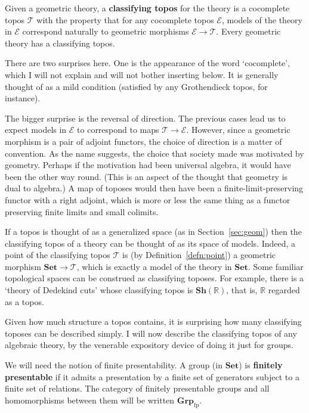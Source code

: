 \documentclass[12pt]{article}
\newcommand{\cat}[1]{\mathscr{#1}}
\newcommand{\fcat}[1]{\mathbf{#1}}
\newcommand{\Set}{\fcat{Set}}
\newcommand{\reals}{\mathbb{R}}
\newcommand{\demph}[1]{\textbf{\textup{#1}}}
\newcommand{\E}{\cat{E}}
\newcommand{\T}{\cat{T}}
\newcommand{\Sh}{\fcat{Sh}}
\newcommand{\fp}{\mathrm{fp}}
\newcommand{\Gp}{\fcat{Grp}}
\begin{document}
Given a geometric theory, a \demph{classifying topos} for the theory is a
cocomplete topos $\T$ with the property that for any cocomplete topos $\E$,
models of the theory in $\E$ correspond naturally to geometric morphisms $\E
\to \T$.  Every geometric theory has a classifying topos.  

There are two surprises here.  One is the appearance of the word `cocomplete',
which I will not explain and will not bother inserting below.  It is generally
thought of as a mild condition (satisfied by any Grothendieck topos, for
instance).  

The bigger surprise is the reversal of direction.  The previous cases lead us
to expect models in $\E$ to correspond to maps $\T \to \E$.  However, since a
geometric morphism is a pair of adjoint functors, the choice of direction is a
matter of convention.  As the name suggests, the choice that society made was
motivated by geometry.  Perhaps if the motivation had been universal algebra,
it would have been the other way round.  (This is an aspect of the thought
that geometry is dual to algebra.)  A map of toposes would then have been a
finite-limit-preserving functor with a right adjoint, which is more or less
the same thing as a functor preserving finite limits and small colimits.

If a topos is thought of as a generalized space (as in Section~\ref{sec:geom})
then the classifying topos of a theory can be thought of as its space of
models.  Indeed, a point of the classifying topos $\T$ is (by
Definition~\ref{defn:point}) a geometric morphism $\Set \to \T$, which is
exactly a model of the theory in $\Set$.  Some familiar topological spaces can
be construed as classifying toposes.  For example, there is a `theory of
Dedekind cuts' whose classifying topos is $\Sh(\reals)$, that is, $\reals$
regarded as a topos.

Given how much structure a topos contains, it is surprising how many
classifying toposes can be described simply.  I will now describe the
classifying topos of any algebraic theory, by the venerable expository device
of doing it just for groups.

We will need the notion of finite presentability.  A group (in $\Set$) is
\demph{finitely presentable} if it admits a presentation by a finite set of
generators subject to a finite set of relations.  The category of finitely
presentable groups and all homomorphisms between them will be written
$\Gp_\fp$.
\end{document}
